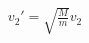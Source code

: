 \documentclass[preview]{standalone}
\begin{document}
\begin{align*}
v_2' = \sqrt{\frac{M}{m}} v_2
\end{align*}
\end{document}
